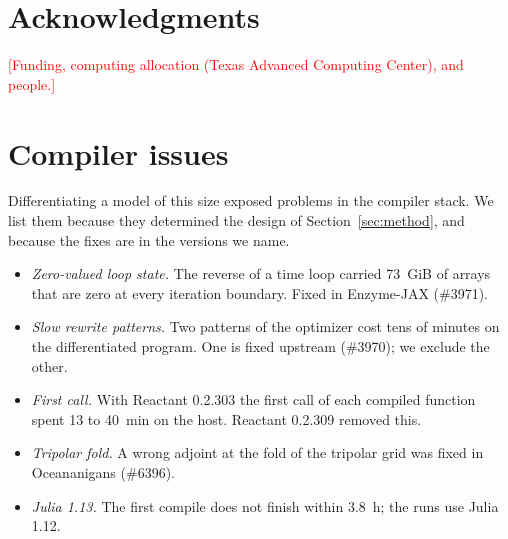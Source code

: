 \documentclass[11pt]{article}
\newcommand{\pending}[1]{\textcolor{red}{[#1]}}
\begin{document}
\section*{Acknowledgments}
\pending{Funding, computing allocation (Texas Advanced Computing Center), and people.}

\appendix
\section{Compiler issues}
\label{sec:compiler}

Differentiating a model of this size exposed problems in the compiler stack. We list them because they determined
the design of Section~\ref{sec:method}, and because the fixes are in the versions we name.
\begin{itemize}
  \item \emph{Zero-valued loop state.} The reverse of a time loop carried \SI{73}{GiB} of arrays that are zero at
        every iteration boundary. Fixed in Enzyme-JAX (\#3971).
  \item \emph{Slow rewrite patterns.} Two patterns of the optimizer cost tens of minutes on the differentiated
        program. One is fixed upstream (\#3970); we exclude the other.
  \item \emph{First call.} With Reactant 0.2.303 the first call of each compiled function spent 13 to
        \SI{40}{min} on the host. Reactant 0.2.309 removed this.
  \item \emph{Tripolar fold.} A wrong adjoint at the fold of the tripolar grid was fixed in Oceananigans
        (\#6396).
  \item \emph{Julia 1.13.} The first compile does not finish within \SI{3.8}{h}; the runs use Julia 1.12.
\end{itemize}



\end{document}
